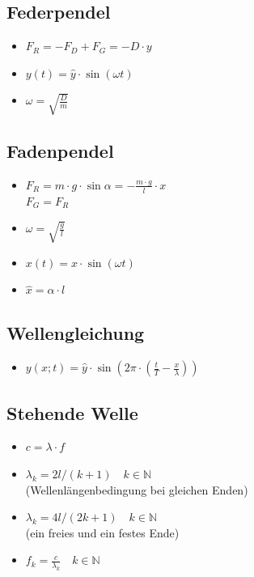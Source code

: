 \documentclass[paper = a4, twocolumn]{scrartcl}
\begin{document}
\subsection{Federpendel}
\begin{itemize}
\item
	\( F_R = -F_D + F_G = -D \cdot y \)
\item
	\( y(t) = \hat{y} \cdot \sin(\omega t) \)
\item
	\( \omega = \sqrt{\frac{D}{m}} \)
\end{itemize}

\subsection{Fadenpendel}
\begin{itemize}
\item
	\( F_R = m \cdot g \cdot \sin \alpha = - \frac{m \cdot g}{l} \cdot x \)\\
	\( F_G = F_R \)
\item
	\( \omega = \sqrt{\frac{g}{l}} \)
\item
	\( x(t) = \hat{x} \cdot \sin(\omega t) \)
\item
	\( \hat{x} = \alpha \cdot l \)
\end{itemize}

\subsection{Wellengleichung}
\begin{itemize}
\item
	\( y(x; t) = \hat{y} \cdot \sin(2 \pi \cdot (\frac{t}{T} -
	\frac{x}{\lambda}) ) \)
\end{itemize}

\subsection{Stehende Welle}
\begin{itemize}
\item
	\( c = \lambda \cdot f \)
\item
	\( \lambda_k = 2l/(k+1) \quad k \in \mathbb{N}\)\\
	(Wellenlängenbedingung bei gleichen Enden)
\item
	\( \lambda_k = 4l/(2k+1) \quad k \in \mathbb{N}\)\\
	(ein freies und ein festes Ende)
\item
	\( f_k = \frac{c}{\lambda_k} \quad k \in \mathbb{N}\)
\end{itemize}
\end{document}
